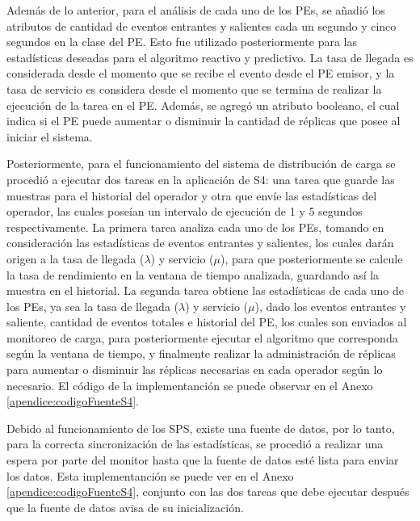 Además de lo anterior, para el análisis de cada uno de los PEs, se añadió los atributos de cantidad de eventos entrantes y salientes cada un segundo y cinco segundos en la clase del PE. Esto fue utilizado posteriormente para las estadísticas deseadas para el algoritmo reactivo y predictivo. La tasa de llegada es considerada desde el momento que se recibe el evento desde el PE emisor, y la tasa de servicio es considera desde el momento que se termina de realizar la ejecución de la tarea en el PE. Además, se agregó un atributo booleano, el cual indica si el PE puede aumentar o disminuir la cantidad de réplicas que posee al iniciar el sistema.

Posteriormente, para el funcionamiento del sistema de distribución de carga se procedió a ejecutar dos tareas en la aplicación de S4: una tarea que guarde las muestras para el historial del operador y otra que envíe las estadísticas del operador, las cuales poseían un intervalo de ejecución de 1 y 5 segundos respectivamente. La primera tarea analiza cada uno de los PEs, tomando en consideración las estadísticas de eventos entrantes y salientes, los cuales darán origen a la tasa de llegada ($\lambda$) y servicio ($\mu$), para que posteriormente se calcule la tasa de rendimiento en la ventana de tiempo analizada, guardando así la muestra en el historial. La segunda tarea obtiene las estadísticas de cada uno de los PEs, ya sea la tasa de llegada ($\lambda$) y servicio ($\mu$), dado los eventos entrantes y saliente, cantidad de eventos totales e historial del PE, los cuales son enviados al monitoreo de carga, para posteriormente ejecutar el algoritmo que corresponda según la ventana de tiempo, y finalmente realizar la administración de réplicas para aumentar o disminuir las réplicas necesarias en cada operador según lo necesario. El código de la implementanción se puede observar en el Anexo \ref{apendice:codigoFuenteS4}.

Debido al funcionamiento de los SPS, existe una fuente de datos, por lo tanto, para la correcta sincronización de las estadísticas, se procedió a realizar una espera por parte del monitor hasta que la fuente de datos esté lista para enviar los datos. Esta implementanción se puede ver en el Anexo \ref{apendice:codigoFuenteS4}, conjunto con las dos tareas que debe ejecutar después que la fuente de datos avisa de su inicialización.

